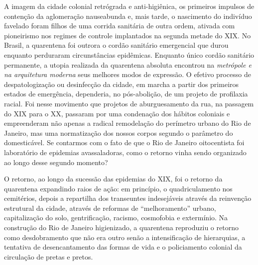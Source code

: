 A imagem da cidade colonial retrógrada e anti-higiênica, os primeiros
impulsos de contenção da aglomeração nauseabunda e, mais tarde, o
nascimento do indivíduo favelado foram filhos de uma corrida sanitária
de outra ordem, ativada com pioneirismo nos regimes de controle
implantados na segunda metade do XIX. No Brasil, a quarentena foi
outrora o cordão sanitário emergencial que durou enquanto perduraram
circunstâncias epidêmicas. Enquanto único cordão sanitário permanente, a
utopia realizada da quarentena absoluta encontrou na \textit{metrópole e
na arquitetura moderna} seus melhores modos de expressão. O efetivo
processo de despatologização ou desinfecção da cidade, em marcha a
partir dos primeiros estados de emergência, dependeria, no pós-abolição,
de um projeto de profilaxia racial. Foi nesse movimento que projetos de
aburguesamento da rua, na passagem do XIX para o XX, passaram por uma
condenação dos hábitos coloniais e empreenderam não apenas a radical
remodelação do perímetro urbano do Rio de Janeiro, mas uma normatização
dos nossos corpos segundo o parâmetro do domesticável. Se contarmos com
o fato de que o Rio de Janeiro oitocentista foi laboratório de epidemias
avassaladoras, como o retorno vinha sendo organizado ao longo desse
segundo momento?

O retorno, ao longo da sucessão das epidemias do XIX, foi o retorno da
quarentena expandindo raios de ação: em princípio, o quadriculamento nos
cemitérios, depois a repartilha dos transeuntes indesejáveis através da
reinvenção estrutural da cidade, através de reformas de ``melhoramento''
urbano, capitalização do solo, gentrificação, racismo, cosmofobia e
extermínio. Na construção do Rio de Janeiro higienizado, a quarentena
reproduziu o retorno como desdobramento que não era outro senão a
intensificação de hierarquias, a tentativa de desencantamento das formas
de vida e o policiamento colonial da circulação de pretas e pretos.

